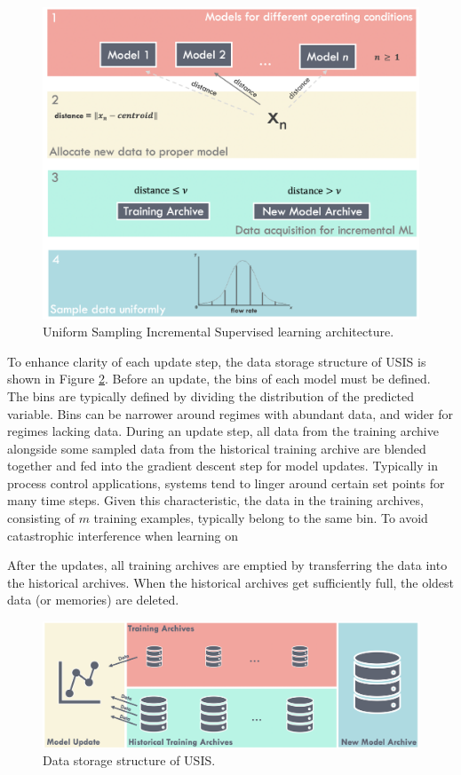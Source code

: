 \begin{figure}
    \centering
    \includegraphics[width=\textwidth]{images/suncor/08IncrementalLearning.png}
    \caption{Uniform Sampling Incremental Supervised learning architecture.}
    \label{fig:02USIS}
\end{figure}

To enhance clarity of each update step, the data storage structure of USIS is shown in Figure \ref{fig:02USISData}. Before an update, the bins of each model must be defined.  The bins are typically defined by dividing the distribution of the predicted variable.  Bins can be narrower around regimes with abundant data, and wider for regimes lacking data.  During an update step, all data from the training archive alongside some sampled data from the historical training archive are blended together and fed into the gradient descent step for model updates.  Typically in process control applications, systems tend to linger around certain set points for many time steps.  Given this characteristic, the data in the training archives, consisting of $m$ training examples, typically belong to the same bin.  To avoid catastrophic interference when learning on 

After the updates, all training archives are emptied by transferring the data into the historical archives.  When the historical archives get sufficiently full, the oldest data (or memories) are deleted.

\begin{figure}[h]
    \centering
    \includegraphics[width=\textwidth]{images/ch2/02USISData.jpeg}
    \caption{Data storage structure of USIS.}
    \label{fig:02USISData}
\end{figure}

